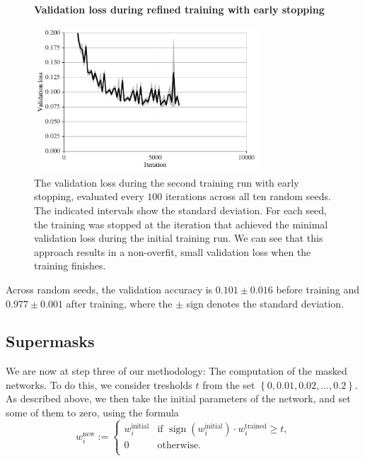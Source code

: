\documentclass[12pt,final,twoside]{article}
\theoremstyle{plain}
\theoremstyle{definition}
\theoremstyle{remark}
\theoremstyle{named}
\begin{document}
\begin{figure}[h]
 
  \centering
  \textbf{Validation loss during refined training with early stopping}\par\medskip
  \includegraphics[width=0.75\textwidth]{plots/refined_trainings.pdf}
  \caption{The validation loss during the second training run with early stopping, evaluated every $100$ iterations across all ten random seeds. The indicated intervals show the standard deviation. For each seed, the training was stopped at the iteration that achieved the minimal validation loss during the initial training run. We can see that this approach results in a non-overfit, small validation loss when the training finishes.}
  \label{fig:refined-training}
\end{figure}

Across random seeds, the validation accuracy is $0.101 \pm 0.016$ before training and $0.977 \pm 0.001$ after training, where the $\pm$ sign denotes the standard deviation.

\subsection{Supermasks}

We are now at step three of our methodology: The computation of the masked networks. To do this, we consider tresholds $t$ from the set $\left\{0, 0.01, 0.02, \ldots, 0.2\right\}$. As described above, we then take the initial parameters of the network, and set some of them to zero, using the formula
$$
w_i^{\text{new}} := \begin{cases}
w_i^{\text{initial}} & \text{if } \operatorname{sign}\left(w_i^{\text{initial}} \right) \cdot w_i^{\text{trained}} \geq t, \\ 
0 & \text{otherwise.} \\
\end{cases}
$$
\end{document}
